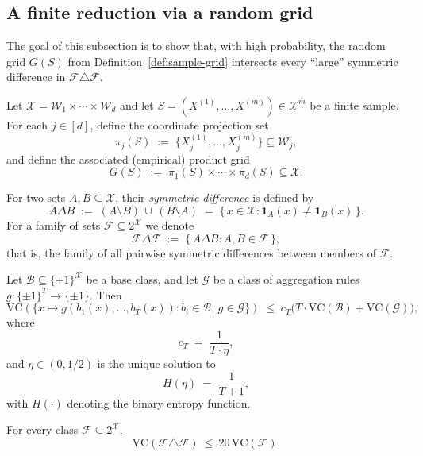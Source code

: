 \documentclass[arxiv]{colt2026}
\newcommand{\X}{\mathcal{X}}
\newcommand{\F}{\mathcal{F}}
\newcommand{\W}{\mathcal{W}}
\newcommand{\VC}{\mathrm{VC}}
\begin{document}
\subsection{A finite reduction via a random grid}
The goal of this subsection is to show that, with high probability, the random grid
$G(S)$ from Definition~\ref{def:sample-grid} intersects every ``large'' symmetric difference in $\F\triangle\F$.

\begin{definition}\label{def:sample-grid}
Let $\X=\W_1\times\cdots\times\W_d$ and let $S=(X^{(1)},\ldots,X^{(m)})\in\X^m$ be a finite sample.
For each $j\in[d]$, define the coordinate projection set
\[
\pi_j(S)\;:=\;\{X^{(1)}_j,\ldots,X^{(m)}_j\}\subseteq \W_j,
\]
and define the associated (empirical) product grid
\[
G(S)\;:=\;\pi_1(S)\times\cdots\times\pi_d(S)\subseteq \X.
\]
\end{definition}

\begin{definition}\label{def:symmetric-diff}
For two sets $A,B\subseteq \X$, their \emph{symmetric difference} is defined by
\[
A\Delta B \;:=\; (A\setminus B)\,\cup\, (B\setminus A)
\;=\;\{\,x\in\X : \mathbf{1}_A(x)\neq \mathbf{1}_B(x)\,\}.
\]
For a family of sets $\F\subseteq 2^{\X}$ we denote
\[
\F\Delta\F \;:=\; \{\,A\Delta B : A,B\in\F\,\},
\]
that is, the family of all pairwise symmetric differences between members of $\F$.
\end{definition}

\begin{theorem}
\label{thm:vc-aggregation}
Let $\mathcal{B} \subseteq \{\pm1\}^{\mathcal{X}}$ be a base class, and let
$\mathcal{G}$ be a class of aggregation rules
$g : \{\pm1\}^T \to \{\pm1\}$.
Then
\[
\VC\!\left(
\bigl\{
x \mapsto g(b_1(x),\dots,b_T(x)) :
b_i \in \mathcal{B},\, g \in \mathcal{G}
\bigr\}
\right)
\;\le\;
c_T\bigl(T\cdot \VC(\mathcal{B}) + \VC(\mathcal{G})\bigr),
\]
where
\[
c_T \;=\; \frac{1}{T \cdot \eta},
\]
and $\eta \in (0,1/2)$ is the unique solution to
\[
H(\eta) \;=\; \frac{1}{T+1},
\]
with $H(\cdot)$ denoting the binary entropy function.
\end{theorem}

\begin{corollary}\label{cor:vc-symdiff}
For every class $\F\subseteq 2^{\X}$,
\[
\VC(\F\triangle\F)\ \le\ 20\,\VC(\F).
\]
\end{corollary}
\end{document}
